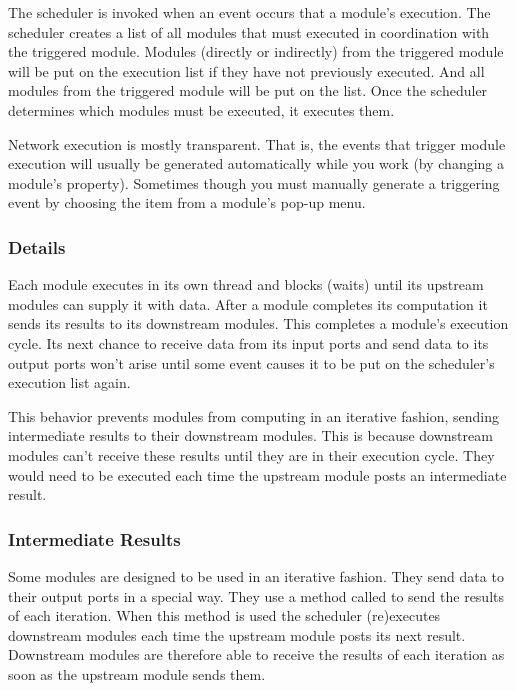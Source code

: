 The scheduler is invoked when an event occurs that  a
module's execution.  The scheduler creates a list of all modules that must
executed in coordination with the triggered module. Modules
 (directly or indirectly) from the triggered module will be
put on the execution list if they have not previously executed.  And all
modules  from the triggered module will be put on the
list.  Once the scheduler determines which modules must be executed, it
executes them.

Network execution is mostly transparent.  That is, the events that trigger
module execution will usually be generated automatically while you work
(\eg by changing a module's property).  Sometimes though you must manually
generate a triggering event by choosing the  item from a
module's pop-up menu.

\subsubsection{Details}

Each module executes in its own thread and blocks (waits) until its upstream
modules can supply it with data.  After a module completes its computation
it sends its results to its downstream modules.  This completes a module's
execution cycle.  Its next chance to receive data from its input ports
and send data to its output ports won't arise until some event
causes it to be put on the scheduler's execution list again.  

This behavior prevents modules from computing in an iterative fashion,
sending intermediate results to their downstream modules.  This is because
downstream modules can't receive these results until they are in their
execution cycle.  They would need to be executed each time the
upstream module posts an intermediate result.


\subsubsection{Intermediate Results}

Some modules are designed to be used in an iterative fashion.  They send
data to their output ports in a special way.  They use a method called
 to send the results of each iteration.  When
this method is used the scheduler (re)executes downstream modules each time
the upstream module posts its next result.  Downstream modules are
therefore able to receive the results of each iteration as soon as the
upstream module sends them.

